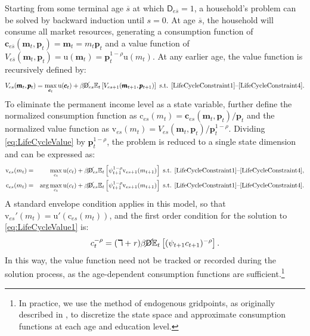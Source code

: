 \documentclass[11pt,a4paper,pdftex]{article}\usepackage[pdftex]{graphicx}\usepackage{epstopdf} \usepackage[pdftex]{hyperref}
\newcommand{\cFunc}{\ensuremath{\mathrm{c}}}
\newcommand{\cLev}{\ensuremath{\pmb{c}}}
\newcommand{\cRat}{\ensuremath{c}}
\newcommand{\CRRA}{\ensuremath{\rho}}
\newcommand{\Discount}{\ensuremath{\beta}}
\newcommand{\Ex}{\ensuremath{\mathbb{E}}} %
\newcommand{\mLev}{\ensuremath{\pmb{m}}}
\newcommand{\mRat}{\ensuremath{m}}
\newcommand{\PDies}{\ensuremath{\mathsf{D}}}
\newcommand{\pLev}{\ensuremath{\pmb{p}}}
\newcommand{\PLives}{\ensuremath{\cancel{\PDies}}}
\newcommand{\pshk}{\psi} %
\newcommand{\rProd}{\ensuremath{\mathit{r}}}
\newcommand{\util}{{\ensuremath{\mathrm{u}}}}
\newcommand{\vFunc}{\ensuremath{\mathrm{v}}}
\begin{document}
Starting from some terminal age $\overline{s}$ at which $\PDies_{e\overline{s}} = 1$, a household's problem can be solved by backward induction until $s = 0$.  At age $\overline{s}$, the household will consume all market resources, generating a consumption function of $\cLev_{e\overline{s}}(\mLev_t,\pLev_t) = \mLev_t = \mRat_t \pLev_t$ and a value function of $V_{e\overline{s}}(\mLev_t,\pLev_t) = \util(\mLev_t) = \pLev_t^{1-\CRRA} \util(\mRat_t)$.  At any earlier age, the value function is recursively defined by:
\begin{equation}
\label{eq:LifeCycleValue}
V_{es}(\mLev_t,\pLev_t) = \max_{\cLev_t} \util(\cLev_t) + \Discount \PLives_{es} \Ex_t \left[ V_{es+1}(\mLev_{t+1},\pLev_{t+1})\right] \text{ s.t. \eqref{LifeCycleConstraint1}--\eqref{LifeCycleConstraint4}}.
\end{equation}
To eliminate the permanent income level as a state variable, further define the normalized consumption function as $\cFunc_{es}(\mRat_t) = \cLev_{es}(\mLev_t,\pLev_t)/\pLev_t$ and the normalized value function as $\vFunc_{es}(\mRat_t) = V_{es}(\mLev_t,\pLev_t)/\pLev_t^{1-\CRRA}$.  Dividing \eqref{eq:LifeCycleValue} by $\pLev_t^{1-\CRRA}$, the problem is reduced to a single state dimension and can be expressed as:
\begin{eqnarray}\label{eq:LifeCycleValue1}
\vFunc_{es}(\mRat_t) &=& \max_{\cRat_t} \util(\cRat_t) + \Discount \PLives_{es} \Ex_t \left[\pshk_{t+1}^{1-\CRRA} \vFunc_{es+1}(\mRat_{t+1})\right] \text{ s.t. \eqref{LifeCycleConstraint1}--\eqref{LifeCycleConstraint4}},\\
\cFunc_{es}(\mRat_t) &=& \arg\max_{\cRat_t} \util(\cRat_t) + \Discount \PLives_{es} \Ex_t \left[\pshk_{t+1}^{1-\CRRA} \vFunc_{es+1}(\mRat_{t+1})\right] \text{ s.t. \eqref{LifeCycleConstraint1}--\eqref{LifeCycleConstraint4}}. \nonumber
\end{eqnarray}
A standard envelope condition applies in this model, so that $\vFunc_{es}'(\mRat_t) = \util'(\cFunc_{es}(\mRat_t))$, and the first order condition for the solution to \eqref{eq:LifeCycleValue1} is:
\begin{equation}
\cRat_t^{-\CRRA} = (\daleth +\rProd) \Discount \PLives \Ex_t \left[ (\pshk_{t+1} \cRat_{t+1})^{-\CRRA} \right].
\end{equation}
In this way, the value function need not be tracked or recorded during the solution process, as the age-dependent consumption functions are sufficient.\footnote{In practice, we use the method of endogenous gridpoints, as originally described in \cite{EndogenousGridpoints}, to discretize the state space and approximate consumption functions at each age and education level.}
\end{document}
